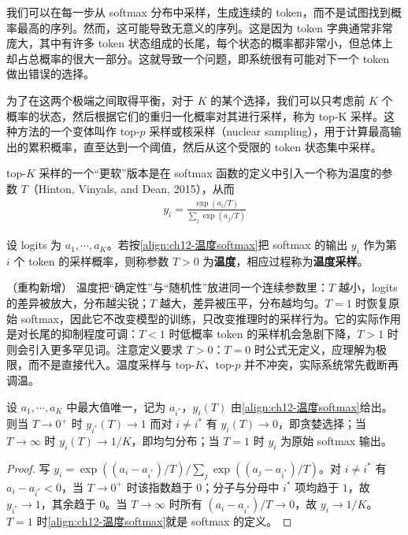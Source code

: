 \documentclass[../../main.tex]{subfiles}
\begin{document}
我们可以在每一步从 softmax 分布中采样，生成连续的 token，而不是试图找到概率最高的序列。然而，这可能导致无意义的序列。这是因为 token 字典通常非常庞大，其中有许多 token 状态组成的长尾，每个状态的概率都非常小，但总体上却占总概率的很大一部分。这就导致一个问题，即系统很有可能对下一个 token 做出错误的选择。

为了在这两个极端之间取得平衡，对于 $K$ 的某个选择，我们可以只考虑前 $K$ 个概率的状态，然后根据它们的重归一化概率对其进行采样，称为 top-K 采样。这种方法的一个变体叫作 top-$p$ 采样或核采样（nuclear sampling），用于计算最高输出的累积概率，直至达到一个阈值，然后从这个受限的 token 状态集中采样。

top-$K$ 采样的一个“更软”版本是在 softmax 函数的定义中引入一个称为温度的参数 $T$（Hinton, Vinyals, and Dean, 2015），从而
\begin{align}
y_i=\frac{\exp\left(a_i/T\right)}{\sum_j\exp\left(a_j/T\right)}
\label{align:ch12-温度softmax}
\end{align}

\begin{definition}[温度采样]\label{definition:ch12-温度采样}
设 logits 为 $a_1,\cdots,a_K$。若按\eqref{align:ch12-温度softmax}把 softmax 的输出 $y_i$ 作为第 $i$ 个 token 的采样概率，则称参数 $T>0$ 为\textbf{温度}，相应过程称为\textbf{温度采样}。
\end{definition}

\begin{remark}（重构新增）
温度把“确定性”与“随机性”放进同一个连续参数里：$T$ 越小，logits 的差异被放大，分布越尖锐；$T$ 越大，差异被压平，分布越均匀。$T=1$ 时恢复原始 softmax，因此它不改变模型的训练，只改变推理时的采样行为。它的实际作用是对长尾的抑制程度可调：$T<1$ 时低概率 token 的采样机会急剧下降，$T>1$ 时则会引入更多罕见词。注意定义要求 $T>0$：$T=0$ 时公式无定义，应理解为极限，而不是直接代入。温度采样与 top-$K$、top-$p$ 并不冲突，实际系统常先截断再调温。
\end{remark}

\begin{proposition}[温度的极限行为]\label{proposition:ch12-温度极限}
设 $a_1,\cdots,a_K$ 中最大值唯一，记为 $a_{i^*}$，$y_i(T)$ 由\eqref{align:ch12-温度softmax}给出。则当 $T\to0^{+}$ 时 $y_{i^*}(T)\to1$ 而对 $i\neq i^*$ 有 $y_i(T)\to0$，即贪婪选择；当 $T\to\infty$ 时 $y_i(T)\to1/K$，即均匀分布；当 $T=1$ 时 $y_i$ 为原始 softmax 输出。
\end{proposition}

\begin{proof}
写 $y_i=\exp\left((a_i-a_{i^*})/T\right)\big/\sum_j\exp\left((a_j-a_{i^*})/T\right)$。对 $i\neq i^*$ 有 $a_i-a_{i^*}<0$，当 $T\to0^{+}$ 时该指数趋于 $0$；分子与分母中 $i^*$ 项均趋于 $1$，故 $y_{i^*}\to1$，其余趋于 $0$。当 $T\to\infty$ 时所有 $(a_i-a_{i^*})/T\to0$，故 $y_i\to1/K$。$T=1$ 时\eqref{align:ch12-温度softmax}就是 softmax 的定义。
\end{proof}
\end{document}
